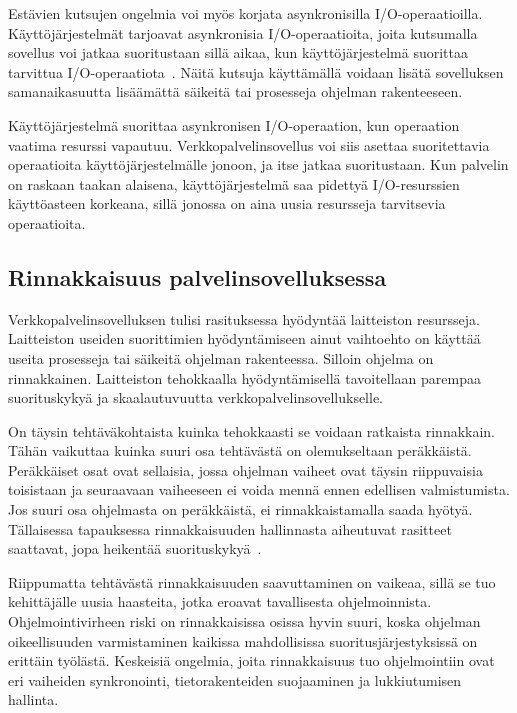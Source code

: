 \documentclass[finnish]{tktltiki2}%
\theoremstyle{definition}
\theoremstyle{remark}
\begin{document}
Estävien kutsujen ongelmia voi myös korjata asynkronisilla I/O-operaatioilla.
Käyttöjärjestelmät tarjoavat asynkronisia I/O-operaatioita, joita kutsumalla
sovellus voi jatkaa suoritustaan sillä aikaa, kun käyttöjärjestelmä
suorittaa tarvittua I/O-operaatiota~\cite{schmidt_reactor:_1995}.
Näitä kutsuja käyttämällä voidaan
lisätä sovelluksen samanaikasuutta lisäämättä säikeitä
tai prosesseja ohjelman rakenteeseen.

Käyttöjärjestelmä suorittaa asynkronisen I/O-operaation,
kun operaation vaatima resurssi vapautuu. Verkkopalvelinsovellus
voi siis asettaa suoritettavia operaatioita käyttöjärjestelmälle
jonoon, ja itse jatkaa suoritustaan. Kun palvelin
on raskaan taakan alaisena, käyttöjärjestelmä saa pidettyä
I/O-resurssien käyttöasteen korkeana, sillä jonossa on aina
uusia resursseja tarvitsevia operaatioita.

\subsection{Rinnakkaisuus palvelinsovelluksessa}
Verkkopalvelinsovelluksen tulisi rasituksessa hyödyntää 
laitteiston resursseja. Laitteiston useiden suorittimien
hyödyntämiseen ainut vaihtoehto on käyttää
useita prosesseja tai säikeitä ohjelman rakenteessa.
Silloin ohjelma on rinnakkainen.
Laitteiston tehokkaalla hyödyntämisellä
tavoitellaan parempaa 
suorituskykyä ja skaalautuvuutta
verkkopalvelinsovellukselle.

On täysin tehtäväkohtaista kuinka tehokkaasti se voidaan ratkaista rinnakkain.
Tähän vaikuttaa kuinka suuri osa tehtävästä on olemukseltaan peräkkäistä.
Peräkkäiset osat ovat sellaisia, jossa ohjelman vaiheet ovat täysin
riippuvaisia toisistaan ja seuraavaan vaiheeseen ei voida mennä ennen edellisen
valmistumista. Jos suuri osa ohjelmasta on peräkkäistä, ei rinnakkaistamalla
saada hyötyä. Tällaisessa tapauksessa rinnakkaisuuden hallinnasta aiheutuvat
rasitteet saattavat, jopa heikentää suorituskykyä~\cite{stallings_operating_2018}.

Riippumatta tehtävästä rinnakkaisuuden saavuttaminen on vaikeaa,
sillä se tuo kehittäjälle uusia haasteita, jotka eroavat tavallisesta
ohjelmoinnista. Ohjelmointivirheen riski on rinnakkaisissa osissa hyvin suuri,
koska ohjelman oikeellisuuden varmistaminen kaikissa mahdollisissa
suoritusjärjestyksissä on erittäin työlästä.
Keskeisiä ongelmia, joita rinnakkaisuus tuo ohjelmointiin ovat eri vaiheiden
synkronointi, tietorakenteiden suojaaminen ja lukkiutumisen hallinta.
\end{document}
